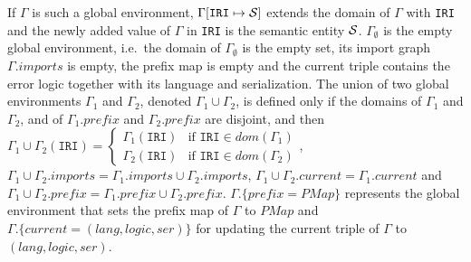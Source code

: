 \documentclass[10pt,fleqn,final]{scrreprt}
\newcommand{\cbs}[0]{\color{red}\xspace} %
\newcommand{\cbe}[0]{\color{black}\xspace} %
\newcommand*{\syntax}[1]{\texttt{#1}}
\newcommand{\semdom}[1]{
\begin{center}
\fbox{$#1$}
\end{center}
}
\newcommand{\prefix}{\mathit{prefix}}
\newcommand{\current}{\mathit{current}}
\newcommand{\PMap}{\mathit{PMap}}
\newenvironment{definitions}[0]{\medskip }{}
\begin{document}
\begin{definitions}
If $\Gamma$ is such a global environment, $\Gamma[\syntax{IRI} \mapsto \cS]$
extends the domain of $\Gamma$ with \syntax{IRI} and
the newly added value of $\Gamma$ in \syntax{IRI} is the semantic entity ${\cal S}$.
 $\Gamma_\emptyset$ is the empty global environment, i.e.~the domain of $\Gamma_\emptyset$ is the empty set, its import graph $\Gamma.imports$ is empty,
the prefix map is empty and the current triple contains the error logic together with its language and serialization.
The union of two global environments $\Gamma_1$ and $\Gamma_2$, 
denoted $\Gamma_1\cup\Gamma_2$, is defined only if the domains of $\Gamma_1$ and $\Gamma_2$,
and of $\Gamma_1.\prefix$ and $\Gamma_2.\prefix$ are disjoint, and then
$\Gamma_1\cup\Gamma_2(\syntax{IRI}) = \begin{cases}
\Gamma_1(\syntax{IRI})& \mbox{if } \syntax{IRI} \in dom(\Gamma_1) \\
\Gamma_2(\syntax{IRI})& \mbox{if } \syntax{IRI} \in dom(\Gamma_2)
\end{cases}$, 
$\Gamma_1\cup\Gamma_2.imports = \Gamma_1.imports \cup \Gamma_2.imports$,
$\Gamma_1\cup\Gamma_2.\current = \Gamma_1.\current$
and $\Gamma_1\cup\Gamma_2.\prefix = \Gamma_1.\prefix \cup \Gamma_2.\prefix$.
\cbs  $\Gamma.\{\prefix = \PMap\}$ represents the global environment that sets\cbe the prefix map of 
$\Gamma$ to $\PMap$ and $\Gamma.\{\current  = (lang, logic, ser)\}$ for updating the current triple of $\Gamma$ to
$(lang, logic, ser)$.



%


\end{definitions}
\end{document}
